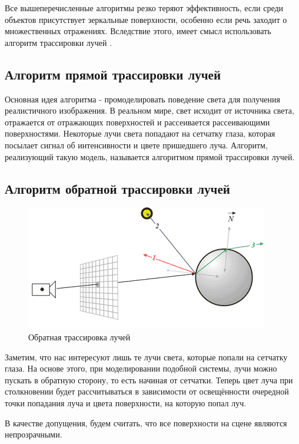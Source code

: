\documentclass[a4paper, 14pt]{report}
\begin{document}
	Все вышеперечисленные алгоритмы резко теряют эффективность, если среди объектов присутствует зеркальные поверхности, особенно если речь заходит о множественных отражениях. Вследствие этого, имеет смысл использовать алгоритм трассировки лучей \cite{computergraphics}.
	
	\subsection{Алгоритм прямой трассировки лучей}
	Основная идея алгоритма - промоделировать поведение света для получения реалистичного изображения. В реальном мире, свет исходит от источника света, отражается от отражающих поверхностей и рассеивается рассеивающими поверхностями. Некоторые лучи света попадают на сетчатку глаза, которая посылает сигнал об интенсивности и цвете пришедшего луча. Алгоритм, реализующий такую модель, называется алгоритмом прямой трассировки лучей.
	
	\subsection{Алгоритм обратной трассировки лучей}
	\begin{figure}[ht]
		\centering
		\includegraphics[width=1\linewidth]{backward_ray_trace}
		\caption{Обратная трассировка лучей}
		\label{fig:backward_ray_trace}
	\end{figure}

	Заметим, что нас интересуют лишь те лучи света, которые попали на сетчатку глаза. На основе этого, при моделировании подобной системы, лучи можно пускать в обратную сторону, то есть начиная от сетчатки. Теперь цвет луча при столкновении будет рассчитываться в зависимости от освещённости очередной точки попадания луча и цвета поверхности, на которую попал луч.
	
	В качестве допущения, будем считать, что все поверхности на сцене являются непрозрачными.
	
\end{document}
